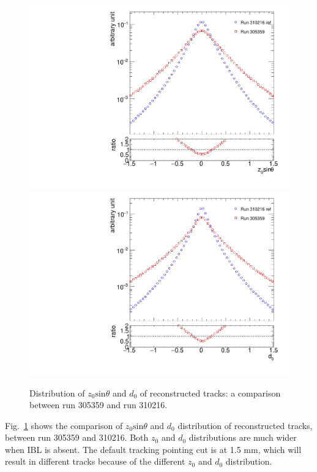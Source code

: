\begin{figure}[H]
\centering
\includegraphics[width=0.45\linewidth]{figs/sec_evtSlc/GRLpp2016/305359_dis_z0.pdf}
\includegraphics[width=0.45\linewidth]{figs/sec_evtSlc/GRLpp2016/305359_dis_d0.pdf}
\caption{Distribution of $z_{0}\text{sin}\theta$ and $d_{0}$ of reconstructed tracks: a comparison between run 305359 and run 310216.}
\label{fig:GRLpp2016_305359_z0_d0}
\end{figure}
Fig.~\ref{fig:GRLpp2016_305359_z0_d0} shows the comparison of $z_{0}\text{sin}\theta$ and $d_{0}$ distribution of reconstructed tracks, between run 305359 and 310216. Both $z_{0}$ and $d_{0}$ distributions are much wider when IBL is absent. The default tracking pointing cut is at 1.5 mm, which will result in different tracks because of the different $z_{0}$ and $d_{0}$ distribution.

